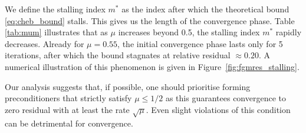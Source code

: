 \documentclass{siamart251216}
\newenvironment{lauri}{\begin{quote}\color{brilliantrose} \small\sf Lauri $\clubsuit$~}{\end{quote}}
\begin{document}
{We define the stalling index $m^*$ as the index after which the theoretical bound \eqref{eq:cheb_bound} stalls. This gives us the length of the convergence phase. %
Table \ref{tab:mum} illustrates that as $\mu$ increases beyond 0.5, the stalling index $m^*$ rapidly decreases. Already for $\mu = 0.55$, the initial convergence phase lasts only for 5 iterations, after which the bound stagnates at relative residual $\approx 0.20$. 
A numerical illustration of this phenomenon is given in Figure~\ref{fig:fgmres_stalling}. 



Our analysis suggests that, if possible, one should prioritise forming preconditioners that strictly satisfy $\mu \leq 1/2$ as this guarantees convergence to zero residual with at least the rate $\sqrt{\mu}$. Even slight violations of this condition can be detrimental for convergence.   


}
\end{document}
